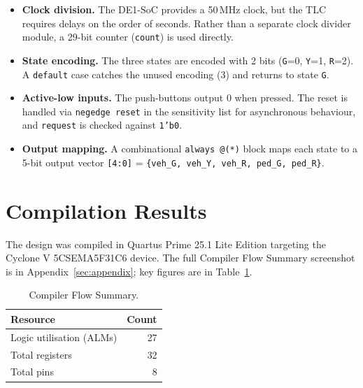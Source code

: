 \documentclass[10pt,a4paper]{article}
\theoremstyle{definition} %
\begin{document}
\begin{itemize}
    \item \textbf{Clock division.} The DE1-SoC provides a 50\,MHz clock, but the TLC requires delays on the order of seconds. Rather than a separate clock divider module, a 29-bit counter (\texttt{count}) is used directly.
    \item \textbf{State encoding.} The three states are encoded with 2 bits (\texttt{G}=0, \texttt{Y}=1, \texttt{R}=2). A \texttt{default} case catches the unused encoding (3) and returns to state \texttt{G}.
    \item \textbf{Active-low inputs.} The push-buttons output 0 when pressed. The reset is handled via \texttt{negedge reset} in the sensitivity list for asynchronous behaviour, and \texttt{request} is checked against \texttt{1'b0}.
    \item \textbf{Output mapping.} A combinational \texttt{always @(*)} block maps each state to a 5-bit output vector \texttt{[4:0]} = \texttt{\{veh\_G, veh\_Y, veh\_R, ped\_G, ped\_R\}}.
\end{itemize}

\section{Compilation Results}

The design was compiled in Quartus Prime 25.1 Lite Edition targeting the Cyclone V 5CSEMA5F31C6 device. The full Compiler Flow Summary screenshot is in Appendix~\ref{sec:appendix}; key figures are in Table~\ref{tab:compilation}.

\begin{table}[htbp]
    \centering
    \caption{Compiler Flow Summary.}
    \label{tab:compilation}
    \begin{tabular}{lr}
        \toprule
        Resource                 & Count \\
        \midrule
        Logic utilisation (ALMs) & 27    \\
        Total registers          & 32    \\
        Total pins               & 8     \\
        \bottomrule
    \end{tabular}
\end{table}
\end{document}
